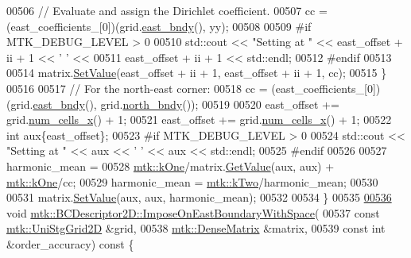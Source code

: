 \begin{DoxyCode}
00506     \textcolor{comment}{// Evaluate and assign the Dirichlet coefficient.}
00507     cc = (east\_coefficients\_[0])(grid.\hyperlink{classmtk_1_1UniStgGrid2D_a03f689eb29a6369b82ce1207c655d5ff}{east\_bndy}(), yy);
00508 
00509 \textcolor{preprocessor}{    #if MTK\_DEBUG\_LEVEL > 0}
00510     std::cout << \textcolor{stringliteral}{"Setting at "} << east\_offset + ii + 1 << \textcolor{charliteral}{' '} <<
00511       east\_offset + ii + 1 << std::endl;
00512 \textcolor{preprocessor}{    #endif}
00513 
00514     matrix.\hyperlink{classmtk_1_1DenseMatrix_a784ce5784109ac86bfb9d8562b334b13}{SetValue}(east\_offset + ii + 1, east\_offset + ii + 1, cc);
00515   \}
00516 
00517   \textcolor{comment}{// For the north-east corner:}
00518   cc = (east\_coefficients\_[0])(grid.\hyperlink{classmtk_1_1UniStgGrid2D_a03f689eb29a6369b82ce1207c655d5ff}{east\_bndy}(), grid.\hyperlink{classmtk_1_1UniStgGrid2D_afe1ead253cdeb5503e0489eba8fd84e2}{north\_bndy}());
00519 
00520   east\_offset += grid.\hyperlink{classmtk_1_1UniStgGrid2D_a2d182866a398aba8e4829590e85bf939}{num\_cells\_x}() + 1;
00521   east\_offset += grid.\hyperlink{classmtk_1_1UniStgGrid2D_a2d182866a398aba8e4829590e85bf939}{num\_cells\_x}() + 1;
00522   \textcolor{keywordtype}{int} aux\{east\_offset\};
00523 \textcolor{preprocessor}{  #if MTK\_DEBUG\_LEVEL > 0}
00524   std::cout << \textcolor{stringliteral}{"Setting at "} << aux << \textcolor{charliteral}{' '} << aux << std::endl;
00525 \textcolor{preprocessor}{  #endif}
00526 
00527   harmonic\_mean =
00528     \hyperlink{group__c01-roots_ga26407c24d43b6b95480943340d285c71}{mtk::kOne}/matrix.\hyperlink{classmtk_1_1DenseMatrix_a4b23ecbebd970b5eea915dbb50691024}{GetValue}(aux, aux) + \hyperlink{group__c01-roots_ga26407c24d43b6b95480943340d285c71}{mtk::kOne}/cc;
00529   harmonic\_mean = \hyperlink{group__c01-roots_gaf39c2d851a2db744f4feb1c5ab3ec2cf}{mtk::kTwo}/harmonic\_mean;
00530 
00531   matrix.\hyperlink{classmtk_1_1DenseMatrix_a784ce5784109ac86bfb9d8562b334b13}{SetValue}(aux, aux, harmonic\_mean);
00532 
00534 \}
00535 
\hypertarget{mtk__bc__descriptor__2d_8cc_source_l00536}{}\hyperlink{classmtk_1_1BCDescriptor2D_a7208d08bfa84192e13c848093eaa88f0}{00536} \textcolor{keywordtype}{void} \hyperlink{classmtk_1_1BCDescriptor2D_a7208d08bfa84192e13c848093eaa88f0}{mtk::BCDescriptor2D::ImposeOnEastBoundaryWithSpace}(
00537     \textcolor{keyword}{const} \hyperlink{classmtk_1_1UniStgGrid2D}{mtk::UniStgGrid2D} &grid,
00538     \hyperlink{classmtk_1_1DenseMatrix}{mtk::DenseMatrix} &matrix,
00539     \textcolor{keyword}{const} \textcolor{keywordtype}{int} &order\_accuracy)\textcolor{keyword}{ const }\{

\end{DoxyCode}
